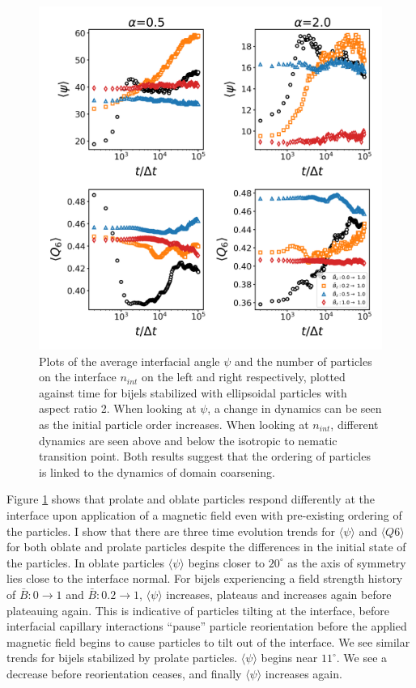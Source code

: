 \begin{figure} 
\centering 
\includegraphics[scale=0.4]{../figures/results/paper2/interface_angle-nint-field_up.png} 
\caption{Plots of the average interfacial angle $\psi$ and the number of particles on the interface $n_{int}$ on the left and right respectively, 
         plotted against time for bijels stabilized with ellipsoidal particles with aspect ratio 2. When looking at $\psi$, a change in dynamics can be 
         seen as the initial particle order increases. When looking at $n_{int}$, different dynamics are seen above and below the isotropic to nematic transition point. 
         Both results suggest that the ordering of particles is linked to the dynamics of domain coarsening.} 
\label{fig:interface_angle-nint-field_up} 
\end{figure}

Figure \ref{fig:interface_angle-nint-field_up} shows that
prolate and oblate particles respond differently at the interface upon application of a magnetic field
even with pre-existing ordering of the particles. I
show that there are three time evolution trends for
$\langle \psi \rangle$ and $\langle Q6 \rangle$ for both oblate and
prolate particles despite the differences in the initial state of the
particles. In oblate particles $\langle \psi \rangle$ begins closer to
$20 ^{\circ}$ as the axis of symmetry lies close to the interface
normal. For bijels experiencing a field strength history of
$\bar{B}: 0 \rightarrow 1$ and $\bar{B}: 0.2 \rightarrow 1$,
$\langle \psi \rangle$ increases, plateaus and increases again before
plateauing again. This is indicative of particles tilting at the
interface, before interfacial capillary interactions ``pause'' particle
reorientation before the applied magnetic field begins to cause
particles to tilt out of the interface. We see similar trends for bijels
stabilized by prolate particles. $\langle \psi \rangle$ begins near
$11 ^{\circ}$. We see a decrease before reorientation ceases, and
finally $\langle \psi \rangle$ increases again.

